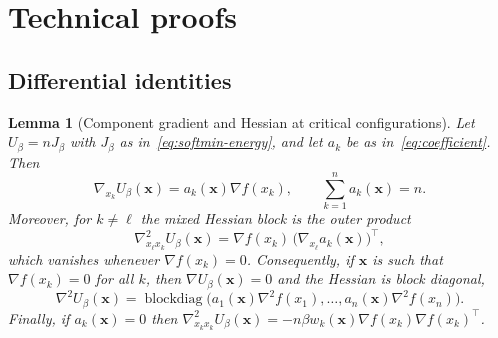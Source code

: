 \documentclass{article}
\theoremstyle{plain}
\newtheorem{lemma}[theorem]{Lemma}
\theoremstyle{definition}
\theoremstyle{remark}
\newcommand{\xx}{\mathbf{x}}
\begin{document}



\newpage
\appendix
\onecolumn
\section{Technical proofs}
\label{apx:technical-proofs}

\subsection{Differential identities}

\begin{lemma}[Component gradient and Hessian at critical configurations]
\label{lem:gradient-hessian}
Let \(U_\beta=nJ_\beta\) with \(J_\beta\) as in~\eqref{eq:softmin-energy}, and let \(a_k\) be as in~\eqref{eq:coefficient}. Then
\begin{equation}
    \nabla_{x_k}U_\beta(\xx)=a_k(\xx)\nabla f(x_k),
    \qquad
    \sum_{k=1}^n a_k(\xx)=n .
    \label{eq:lemma-gradient}
\end{equation}
Moreover, for \(k\ne\ell\) the mixed Hessian block is the outer product
\begin{equation}
    \nabla^2_{x_\ell x_k}U_\beta(\xx)
    =\nabla f(x_k)\,\bigl(\nabla_{x_\ell}a_k(\xx)\bigr)^\top ,
    \label{eq:mixed-block}
\end{equation}
which vanishes whenever \(\nabla f(x_k)=0\). Consequently, if \(\xx\) is such that \(\nabla f(x_k)=0\) for all \(k\), then \(\nabla U_\beta(\xx)=0\) and the Hessian is block diagonal,
\begin{equation}
    \nabla^2 U_\beta(\xx)
    =\operatorname{blockdiag}\bigl(a_1(\xx)\nabla^2 f(x_1),\dots,a_n(\xx)\nabla^2 f(x_n)\bigr).
    \label{eq:block-diagonal-hessian}
\end{equation}
Finally, if \(a_k(\xx)=0\) then \(\nabla^2_{x_kx_k}U_\beta(\xx)=-n\beta w_k(\xx)\nabla f(x_k)\nabla f(x_k)^\top\).
\end{lemma}
\end{document}
